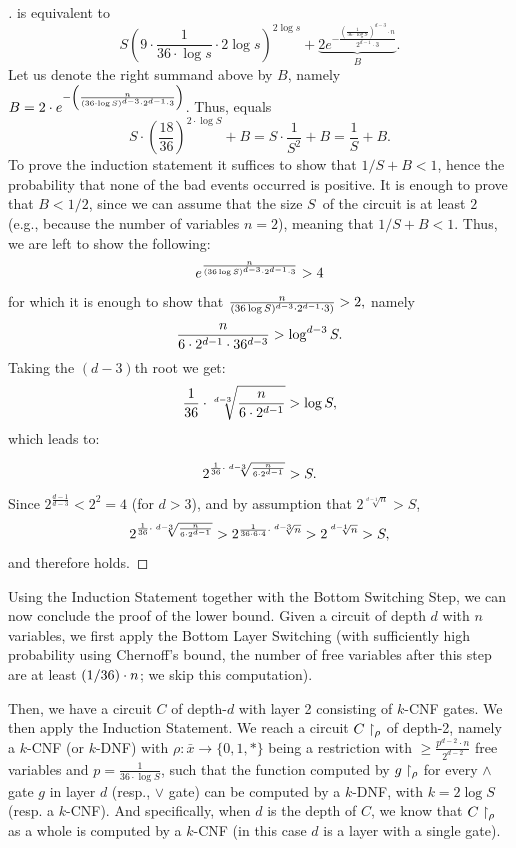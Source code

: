 \begin{proof}[]
 is equivalent to 
\begin{equation}\label{eq:498:27}
S \left( 9 \cdot \frac{1}{36 \cdot \log s} \cdot 2 \log s \right)^{2 \log s} + 
\underbrace{2 e^{-\frac{\left(\frac{1}{36 \cdot \log S }\right)^{d-3} \cdot n}{2^{d-1} \cdot 3}}}_B.
\end{equation}Let us denote the right summand above by $B$, namely $B=2\cdot
e^{-\left(\frac{n}{{(36 \cdot \log S)^{d-3} \cdot 2^{d-1} \cdot 3}}\right)}$.  
Thus,  equals
$$
S \cdot\left(\frac{18}{36}\right)^{2 \cdot \log S}+B =S \cdot \frac{1}{S^2}+B =
\frac{1}{S}+
B.
$$
To prove the induction statement it  suffices to show that $1/S+B<1$, hence the probability that none of the bad events occurred is positive. It is enough to prove  that $B<1/2$, since we can assume that the size $S$\ of the circuit is at least $2$ (e.g., because the number of variables $n=2$), meaning that $1/S+B<1$. Thus, we are left to show the following:
\[
e^{\frac{n}{(36 \log S)^{d-3} \cdot 2^{d-1}\cdot 3}} > 4
\]
for which it is enough to show that 
$
\frac{n}{(36 \log S)^{d-3} \cdot 2^{d-1}\cdot 3)}>2,
$
namely
\[
\frac{n}{6 \cdot 2^{d-1}\cdot 36^{d-3}} > \log^{d-3} S.
\]
Taking the $(d-3)$th root we get:
\[
\frac{1}{36}\cdot \sqrt[d-3]{\frac{n}{6 \cdot 2^{d-1}}} > \log S,
\]
which leads to:

\begin{equation}\label{eq:534:30}
2^{
\frac{1}{36}\cdot \sqrt[d-3]{\frac{n}{6 \cdot 2^{d-1}}}
} >  S.
\end{equation}
Since $2^{\frac{d-1}{d-3}} < 2^2 = 4$ (for $d>3$), and by assumption that $ 2^{
\sqrt[d-1]{n}
}>S$,    
$$
2^{
\frac{1}{36}\cdot \sqrt[d-3]{\frac{n}{6 \cdot 2^{d-1}}}}>
2^{
\frac{1}{36\cdot 6\cdot 4}\cdot\sqrt[d-3]{n}
}
> 2^{
\sqrt[d-1]{n}
}>S,
$$
and therefore   holds. 

\mbox{}
\end{proof} %


Using the Induction Statement together with the Bottom Switching Step,
we can now conclude the proof of the lower bound.
Given a circuit of depth $d$ with $n$ variables,
we first apply the Bottom Layer Switching (with sufficiently high probability using Chernoff's bound, the number of free variables after this step
are at least $(1/36)\cdot n$; we skip this computation).

Then, we have a circuit $C$ of depth-$d$ with layer 2 consisting of  $k$-CNF gates. We  then apply the Induction Statement. We reach a circuit $C \upharpoonright_\rho$ of depth-2, namely a $k$-CNF (or $k$-DNF) with
$\rho: \bar{x} \rightarrow\{0,1, *\}$ being a restriction
with $\geq \frac{p^{d-2} \cdot n}{2^{d-2}}$ free variables and $p=\frac{1}{36 \cdot \log S}$, such that the function computed by $g\upharpoonright_\rho$ for every $\land$ gate $g$ in layer $d$ (resp., $\lor$ gate) can be computed by a $k$-DNF, with $k=2 \log S$ (resp. a $k$-CNF).
And specifically, when $d$ is the depth of $C$, we know that $C\upharpoonright_\rho$ as a whole is computed by a $k$-CNF (in this case $d$ is a layer with a single gate). 



